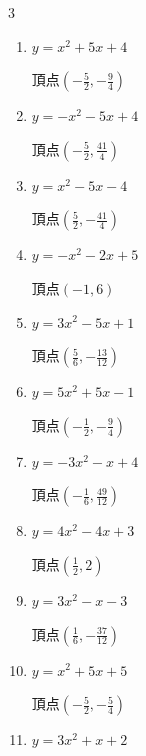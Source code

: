 \begin{multicols}{3}
\begin{enumerate}
        $\displaystyle 頂点\left( -\frac{1}{4} , -\frac{13}{4} \right)$

  \item $\displaystyle y=x^{2}+5x+4$

        $\displaystyle 頂点\left( -\frac{5}{2} , -\frac{9}{4} \right)$

  \item $\displaystyle y=-x^{2}-5x+4$

        $\displaystyle 頂点\left( -\frac{5}{2} , \frac{41}{4} \right)$

\columnbreak %

\resetques

  \item $\displaystyle y=x^{2}-5x-4$

        $\displaystyle 頂点\left( \frac{5}{2} , -\frac{41}{4} \right)$

  \item $\displaystyle y=-x^{2}-2x+5$

        $\displaystyle 頂点\left( -1 , 6 \right)$

  \item $\displaystyle y=3x^{2}-5x+1$

        $\displaystyle 頂点\left( \frac{5}{6} , -\frac{13}{12} \right)$

  \item $\displaystyle y=5x^{2}+5x-1$

        $\displaystyle 頂点\left( -\frac{1}{2} , -\frac{9}{4} \right)$

  \item $\displaystyle y=-3x^{2}-x+4$

        $\displaystyle 頂点\left( -\frac{1}{6} , \frac{49}{12} \right)$

\columnbreak %

  \item $\displaystyle y=4x^{2}-4x+3$

        $\displaystyle 頂点\left( \frac{1}{2} , 2 \right)$

  \item $\displaystyle y=3x^{2}-x-3$

        $\displaystyle 頂点\left( \frac{1}{6} , -\frac{37}{12} \right)$

  \item $\displaystyle y=x^{2}+5x+5$

        $\displaystyle 頂点\left( -\frac{5}{2} , -\frac{5}{4} \right)$

  \item $\displaystyle y=3x^{2}+x+2$


\end{enumerate}
\end{multicols}
